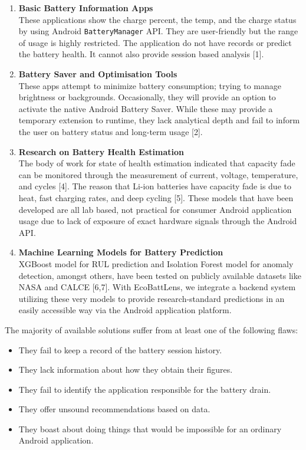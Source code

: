 \documentclass[12pt,a4paper]{report}
\begin{document}
\begin{enumerate}
    \item \textbf{Basic Battery Information Apps} \\
    These applications show the charge percent, the temp, and the charge status by using Android \texttt{BatteryManager} API. They are user-friendly but the range of usage is highly restricted. The application do not have records or predict the battery health. It cannot also provide session based analysis [1].
    
    \item \textbf{Battery Saver and Optimisation Tools} \\
    These apps attempt to minimize battery consumption; trying to manage brightness or backgrounds. Occasionally, they will provide an option to activate the native Android Battery Saver. While these may provide a temporary extension to runtime, they lack analytical depth and fail to inform the user on battery status and long-term usage [2].
    
    \item \textbf{Research on Battery Health Estimation} \\
    The body of work for state of health estimation indicated that capacity fade can be monitored through the measurement of current, voltage, temperature, and cycles [4]. The reason that Li-ion batteries have capacity fade is due to heat, fast charging rates, and deep cycling [5]. These models that have been developed are all lab based, not practical for consumer Android application usage due to lack of exposure of exact hardware signals through the Android API.
    
    \item \textbf{Machine Learning Models for Battery Prediction} \\
    XGBoost model for RUL prediction and Isolation Forest model for anomaly detection, amongst others, have been tested on publicly available datasets like NASA and CALCE [6,7]. With EcoBattLens, we integrate a backend system utilizing these very models to provide research-standard predictions in an easily accessible way via the Android application platform.
\end{enumerate}

The majority of available solutions suffer from at least one of the following flaws:

\begin{itemize}
    \item They fail to keep a record of the battery session history.
    \item They lack information about how they obtain their figures.
    \item They fail to identify the application responsible for the battery drain.
    \item They offer unsound recommendations based on data.
    \item They boast about doing things that would be impossible for an ordinary Android application.
\end{itemize}
\end{document}
